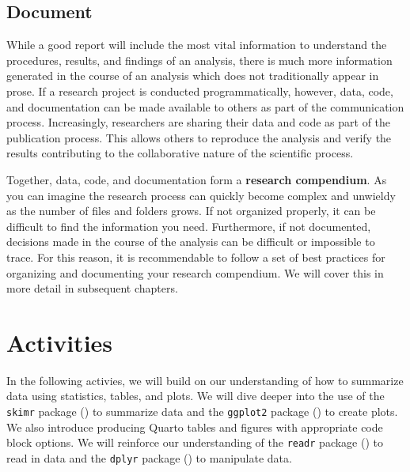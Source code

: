 \documentclass[
  letterpaper,
  DIV=11,
  numbers=noendperiod]{scrreprt}
\theoremstyle{definition}
\theoremstyle{remark}
\begin{document}
\subsection{Document}\label{sec-aa-document}

While a good report will include the most vital information to
understand the procedures, results, and findings of an analysis, there
is much more information generated in the course of an analysis which
does not traditionally appear in prose. If a research project is
conducted programmatically, however, data, code, and documentation can
be made available to others as part of the communication process.
Increasingly, researchers are sharing their data and code as part of the
publication process. This allows others to reproduce the analysis and
verify the results contributing to the collaborative nature of the
scientific process.

Together, data, code, and documentation form a \textbf{research
compendium}. As you can imagine the research process can quickly become
complex and unwieldy as the number of files and folders grows. If not
organized properly, it can be difficult to find the information you
need. Furthermore, if not documented, decisions made in the course of
the analysis can be difficult or impossible to trace. For this reason,
it is recommendable to follow a set of best practices for organizing and
documenting your research compendium. We will cover this in more detail
in subsequent chapters.

\section*{Activities}\label{activities-1}


In the following activies, we will build on our understanding of how to
summarize data using statistics, tables, and plots. We will dive deeper
into the use of the \texttt{skimr} package
() to summarize data and the
\texttt{ggplot2} package () to create plots. We also introduce producing Quarto tables
and figures with appropriate code block options. We will reinforce our
understanding of the \texttt{readr} package
() to read in
data and the \texttt{dplyr} package () to manipulate data.
\end{document}

